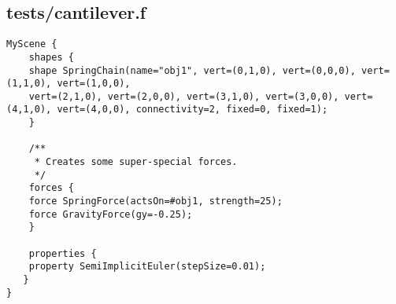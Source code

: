 \subsection*{tests/cantilever.f}
\begin{lstlisting}
MyScene {
    shapes {
	shape SpringChain(name="obj1", vert=(0,1,0), vert=(0,0,0), vert=(1,1,0), vert=(1,0,0), 
	vert=(2,1,0), vert=(2,0,0), vert=(3,1,0), vert=(3,0,0), vert=(4,1,0), vert=(4,0,0), connectivity=2, fixed=0, fixed=1);
    }

    /**
     * Creates some super-special forces.
     */
    forces {
	force SpringForce(actsOn=#obj1, strength=25);
	force GravityForce(gy=-0.25);
    }

    properties { 
	property SemiImplicitEuler(stepSize=0.01);
   }
}
\end{lstlisting}

